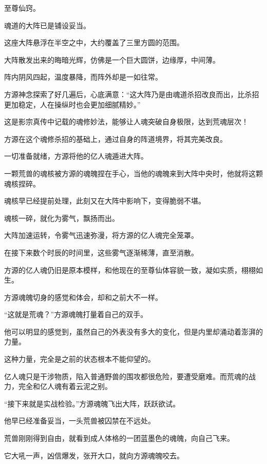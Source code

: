 
\begin{this_body}



至尊仙窍。

魂道的大阵已是铺设妥当。

这座大阵悬浮在半空之中，大约覆盖了三里方圆的范围。

大阵散发出来的晦暗光辉，仿佛是一个巨大圆饼，边缘厚，中间薄。

阵内阴风四起，温度暴降，而阵外却是一如往常。

方源神念探索了好几遍后，心底满意：“这大阵乃是由魂道杀招改良而出，比杀招更加稳定，人在操纵时也会更加细腻精妙。”

这是影宗真传中记载的魂修妙法，能够让人魂突破自身极限，达到荒魂层次！

方源在这个魂修杀招的基础上，通过自身的阵道境界，将其完美改良。

一切准备就绪，方源将他的亿人魂遁进大阵。

一颗荒兽的魂核被方源的魂魄捏在手心，当他的魂魄来到大阵中央时，他就将这颗魂核捏碎。

魂核早已经提前处理，此刻又在大阵中影响下，变得脆弱不堪。

魂核一碎，就化为雾气，飘扬而出。

大阵加速运转，令雾气迅速弥漫，将方源的亿人魂完全笼罩。

在接下来数个时辰的时间里，这些雾气逐渐稀薄，直至消散。

方源的亿人魂仍旧是原本模样，和他现在的至尊仙体容貌一致，凝如实质，栩栩如生。

方源魂魄切身的感觉和体会，却和之前大不一样。

“这就是荒魂？”方源魂魄打量着自己的双手。

他可以明显的感觉到，虽然自己的外表没有多大的变化，但是内里却涌动着澎湃的力量。

这种力量，完全是之前的状态根本不能仰望的。

亿人魂只是干涉物质，陷入普通野兽的围攻都很危险，要遭受磨难。而荒魂的战力，完全和亿人魂有着云泥之别。

“接下来就是实战检验。”方源魂魄飞出大阵，跃跃欲试。

他早已经准备妥当，一头荒兽被囚禁在不远处。

荒兽刚刚得到自由，就看到成人体格的一团蓝墨色的魂魄，向自己飞来。

它大吼一声，凶信爆发，张开大口，就向方源魂魄咬去。


\end{this_body}
